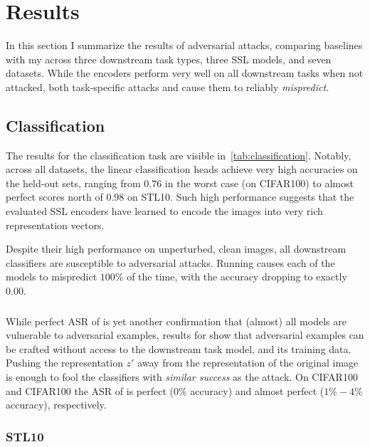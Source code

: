 \chapter{Results}
\label{chap:results}

In this section I summarize the results of adversarial attacks, comparing baselines with my \EmbedAttack across three downstream task types, three SSL models, and seven datasets. While the encoders perform very well on all downstream tasks when not attacked, both task-specific attacks and \EmbedAttack cause them to reliably \textit{mispredict}.

\section{Classification}\label{sec:results_clf}

The results for the classification task are visible in~\cref{tab:classification}. Notably, across all datasets, the linear classification heads achieve very high accuracies on the held-out sets, ranging from $0.76$ in the worst case (\DINOvone on CIFAR100) to almost perfect scores north of $0.98$ on STL10. Such high performance suggests that the evaluated SSL encoders have learned to encode the images into very rich representation vectors.

Despite their high performance on unperturbed, clean images, all downstream classifiers are susceptible to adversarial attacks. Running \PGD causes each of the models to mispredict $100\%$ of the time, with the accuracy dropping to exactly $0.00$.

\subsection{\EmbedAttack}

While perfect ASR of \PGD is yet another confirmation that (almost) all models are vulnerable to adversarial examples, results for \EmbedAttack show that adversarial examples can be crafted without access to the downstream task model, and its training data. Pushing the representation $z'$ away from the representation of the original image is enough to fool the classifiers with \textit{similar success} as the \PGD attack. On CIFAR100 and CIFAR100 the ASR of \EmbedAttack is perfect ($0\%$ accuracy) and almost perfect ($1\%-4\%$ accuracy), respectively. 



\subsection{STL10}

